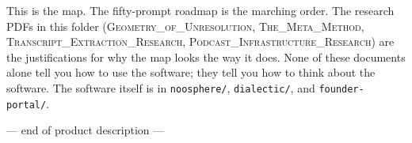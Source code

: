 \documentclass[11pt]{article}
\begin{document}
\begin{intuitionbox}
This is the map. The fifty-prompt roadmap is the marching order. The research PDFs in this folder (\textsc{Geometry\_of\_Unresolution}, \textsc{The\_Meta\_Method}, \textsc{Transcript\_Extraction\_Research}, \textsc{Podcast\_Infrastructure\_Research}) are the justifications for why the map looks the way it does. None of these documents alone tell you how to use the software; they tell you how to think about the software. The software itself is in \texttt{noosphere/}, \texttt{dialectic/}, and \texttt{founder-portal/}.
\end{intuitionbox}

\vspace{2cm}
\begin{center}
\textcolor{slate}{\small --- end of product description ---}
\end{center}
\end{document}
